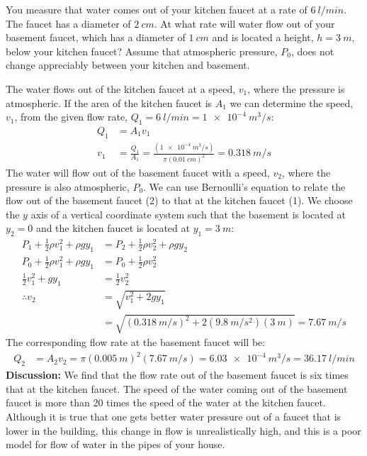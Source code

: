 {{\begin{example}{\label{ex:fluidmechanics:kitchen}You measure that water comes out of your kitchen faucet at a rate of $\SI{6}{l/min}$. The faucet has a diameter of $\SI{2}{cm}$. At what rate will water flow out of your basement faucet, which has a diameter of $\SI{1}{cm}$ and is located a height, $h=\SI{3}{m}$, below your kitchen faucet? Assume that atmospheric pressure, $P_0$, does not change appreciably between your kitchen and basement.}

The water flows out of the kitchen faucet at a speed, $v_1$, where the pressure is atmospheric. If the area of the kitchen faucet is $A_1$ we can determine the speed, $v_1$, from the given flow rate, $Q_1=\SI{6}{l/min}=\SI{1e-4}{m^3/s}$:
\begin{align*}
Q_1 &= A_1 v_1\\
v_1 &= \frac{Q_1}{A_1}=\frac{(\SI{1e-4}{m^3/s})}{\pi (\SI{0.01}{cm})^2}=\SI{0.318}{m/s}
\end{align*}
The water will flow out of the basement faucet with a speed, $v_2$, where the pressure is also atmospheric, $P_0$. We can use Bernoulli's equation to relate the flow out of the basement faucet (2) to that at the kitchen faucet (1). We choose the $y$ axis of a vertical coordinate system such that the basement is located at $y_2=0$ and the kitchen faucet is located at $y_1=\SI{3}{m}$:
\begin{align*}
P_1 +\frac{1}{2}\rho v_1^2+ \rho g y_1&= P_2 + \frac{1}{2}\rho v_2^2 + \rho g y_2\\
P_0+\frac{1}{2}\rho v_1^2+ \rho g y_1&= P_0 + \frac{1}{2}\rho v_2^2 \\
\frac{1}{2} v_1^2+  gy_1&=  \frac{1}{2} v_2^2 \\
\therefore v_2 &= \sqrt{v_1^2 + 2gy_1}\\
&=\sqrt{(\SI{0.318}{m/s})^2+2(\SI{9.8}{m/s^2})(\SI{3}{m})}=\SI{7.67}{m/s}
\end{align*}
The corresponding flow rate at the basement faucet will be:
\begin{align*}
Q_2 &= A_2 v_2 = \pi(\SI{0.005}{m})^2(\SI{7.67}{m/s})=\SI{6.03e-4}{m^3/s}=\SI{36.17}{l/min}
\end{align*}
\textbf{Discussion:} We find that the flow rate out of the basement faucet is six times that at the kitchen faucet. The speed of the water coming out of the basement faucet is more than 20 times the speed of the water at the kitchen faucet. Although it is true that one gets better water pressure out of a faucet that is lower in the building, this change in flow is unrealistically high, and this is a poor model for flow of water in the pipes of your house.


\end{example}}}
